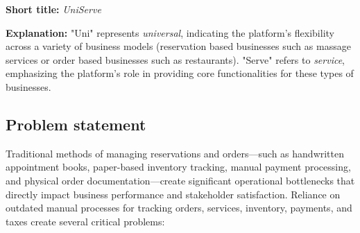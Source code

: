 \documentclass[]{VUMIFTemplateClass}
\begin{document}
\textbf{Short title:} \textit{UniServe}


\textbf{Explanation:} "Uni" represents \emph{universal}, indicating the platform's flexibility across a variety of business models 
(reservation based businesses such as massage services or order based businesses such as restaurants). 
"Serve" refers to \emph{service}, emphasizing the platform’s role in providing core functionalities for these types of businesses.

\subsection{Problem statement}

Traditional methods of managing reservations and orders—such as handwritten
appointment books, paper-based inventory tracking, manual payment processing,
and physical order documentation—create significant operational bottlenecks that
directly impact business performance and stakeholder satisfaction. Reliance on
outdated manual processes for tracking orders, services, inventory, payments,
and taxes create several critical problems:
\end{document}
